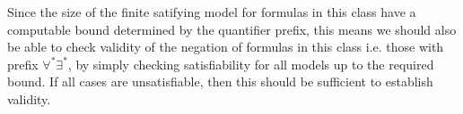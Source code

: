 \documentclass[10pt]{article}
\begin{document}
Since the size of the finite satifying model for formulas in this class have a computable bound determined by the quantifier prefix, this means we should also be able to check validity of the negation of formulas in this class i.e. those with prefix $\forall^*\exists^*$, by simply checking satisfiability for all models up to the required bound. If all cases are unsatisfiable, then this should be sufficient to establish validity.













\end{document}
